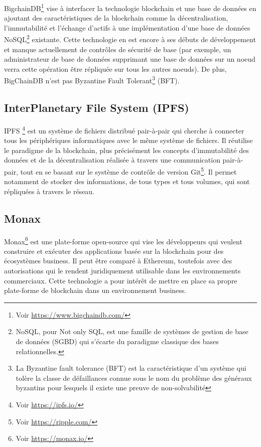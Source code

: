 \documentclass{tnreport}
\begin{document}
BigchainDB\footnote{Voir \url{https://www.bigchaindb.com/}} vise à interfacer la technologie blockchain et une base de données en ajoutant des caractéristiques de la blockchain comme la décentralisation, l'immutabilité et l'échange d'actifs à une implémentation d'une base de données NoSQL\footnote{NoSQL, pour Not only SQL, est une famille de systèmes de gestion de base de données (SGBD) qui s'écarte du paradigme classique des bases relationnelles.} existante. Cette technologie en est encore à ses débuts de développement et manque actuellement de contrôles de sécurité de base (par exemple, un administrateur de base de données supprimant une base de données sur un noeud verra cette opération être répliquée sur tous les autres noeuds). De plus, BigChainDB n'est pas Byzantine Fault Tolerant\footnote{	La Byzantine fault tolerance (BFT) est la caractéristique d'un système qui tolère la classe de défaillances connue sous le nom du problème des généraux byzantins pour lesquels il existe une preuve de non-solvabilité} (BFT).

\subsection{InterPlanetary File System (IPFS)}

IPFS \footnote{Voir \url{https://ipfs.io/}} est un système de fichiers distribué pair-à-pair qui cherche à connecter tous les périphériques informatiques avec le même système de fichiers. Il réutilise le paradigme de la blockchain, plus précisément les concepts d'immutabilité des données et de la décentralisation réalisée à travers une communication pair-à-pair, tout en se basant sur le système de contrôle de version Git\footnote{Voir \url{https://ripple.com/}}. Il permet notamment de stocker des informations, de tous types et tous volumes, qui sont répliquées à travers le réseau. 

\subsection{Monax}

Monax\footnote{Voir \url{https://monax.io/}} est une plate-forme open-source qui vise les développeurs qui veulent construire et exécuter des applications basée sur la blockchain pour des écosystèmes business. Il peut être comparé à Ethereum, toutefois avec des autorisations qui le rendent juridiquement utilisable dans les environnements commerciaux. Cette technologie a pour intérêt de mettre en place sa propre plate-forme de blockchain dans un environnement business.
\end{document}
